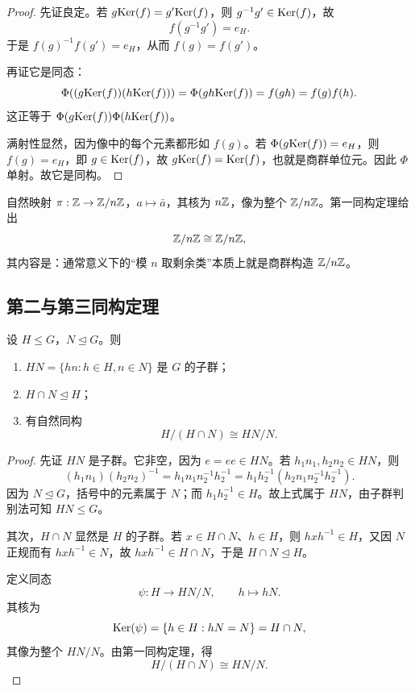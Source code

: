 \begin{proof}
先证良定。若 $g\mathrm{Ker}(f)=g'\mathrm{Ker}(f)$，则 $g^{-1}g'\in \mathrm{Ker}(f)$，故
\[
 f(g^{-1}g')=e_H.
\]
于是 $f(g)^{-1}f(g')=e_H$，从而 $f(g)=f(g')$。

再证它是同态：
\[
 \Phi((g\mathrm{Ker}(f))(h\mathrm{Ker}(f)))=\Phi(gh\mathrm{Ker}(f))=f(gh)=f(g)f(h).
\]
这正等于 $\Phi(g\mathrm{Ker}(f))\Phi(h\mathrm{Ker}(f))$。

满射性显然，因为像中的每个元素都形如 $f(g)$。若 $\Phi(g\mathrm{Ker}(f))=e_H$，则 $f(g)=e_H$，即 $g\in \mathrm{Ker}(f)$，故 $g\mathrm{Ker}(f)=\mathrm{Ker}(f)$，也就是商群单位元。因此 $\Phi$ 单射。故它是同构。
\end{proof}

\begin{example}
自然映射 $\pi:\mathbb{Z}\to \mathbb{Z}/n\mathbb{Z}$，$a\mapsto \bar a$，其核为 $n\mathbb{Z}$，像为整个 $\mathbb{Z}/n\mathbb{Z}$。第一同构定理给出
\[
 \mathbb{Z}/n\mathbb{Z} \cong \mathbb{Z}/n\mathbb{Z},
\]
其内容是：通常意义下的“模 $n$ 取剩余类”本质上就是商群构造 $\mathbb{Z}/n\mathbb{Z}$。
\end{example}

\subsection*{第二与第三同构定理}

\begin{theorem}[第二同构定理]
设 $H\le G$，$N\trianglelefteq G$。则
\begin{enumerate}[label=\textnormal{(\arabic*)}, leftmargin=3em]
  \item $HN=\{hn:h\in H,n\in N\}$ 是 $G$ 的子群；
  \item $H\cap N\trianglelefteq H$；
  \item 有自然同构
  \[
    H/(H\cap N) \cong HN/N.
  \]
\end{enumerate}
\end{theorem}

\begin{proof}
先证 $HN$ 是子群。它非空，因为 $e=ee\in HN$。若 $h_1n_1,h_2n_2\in HN$，则
\[
 (h_1n_1)(h_2n_2)^{-1}=h_1n_1n_2^{-1}h_2^{-1}=h_1h_2^{-1}(h_2n_1n_2^{-1}h_2^{-1}).
\]
因为 $N\trianglelefteq G$，括号中的元素属于 $N$；而 $h_1h_2^{-1}\in H$。故上式属于 $HN$，由子群判别法可知 $HN\le G$。

其次，$H\cap N$ 显然是 $H$ 的子群。若 $x\in H\cap N$、$h\in H$，则 $hxh^{-1}\in H$，又因 $N$ 正规而有 $hxh^{-1}\in N$，故 $hxh^{-1}\in H\cap N$，于是 $H\cap N\trianglelefteq H$。

定义同态
\[
 \psi:H \longrightarrow HN/N, \qquad h \longmapsto hN.
\]
其核为
\[
 \mathrm{Ker}(\psi)=\{h\in H:hN=N\}=H\cap N,
\]
其像为整个 $HN/N$。由第一同构定理，得
\[
 H/(H\cap N) \cong HN/N.
\]
\end{proof}


